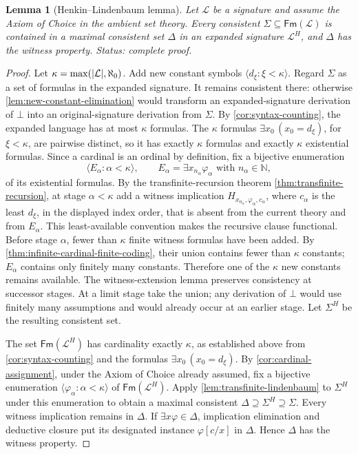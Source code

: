 \documentclass[11pt,oneside,openany]{book}
\theoremstyle{definition}
\theoremstyle{plain}
\newtheorem{lemma}[definition]{Lemma}
\theoremstyle{remark}
\DeclarePairedDelimiter{\abs}{\lvert}{\rvert}
\newcommand{\N}{\mathbb{N}}
\newcommand{\Lang}{\mathcal{L}}
\newcommand{\Fm}{\mathsf{Fm}}
\newcommand{\bottom}{\bot}
\begin{document}
\begin{lemma}[Henkin--Lindenbaum lemma]
\label{lem:henkin-lindenbaum}
Let \(\Lang\) be a signature and assume the Axiom of Choice in the
ambient set theory.  Every consistent
\(\Sigma\subseteq\Fm(\Lang)\) is contained in a maximal consistent set
\(\Delta\) in an expanded signature \(\Lang^H\), and \(\Delta\) has the
witness property.
\textit{Status: complete proof.}
\end{lemma}
\begin{proof}
 Let \(\kappa=\max(\abs{\Lang},\aleph_0)\).  Add new constant symbols
 \(\langle d_\xi:\xi<\kappa\rangle\).  Regard \(\Sigma\) as a set of formulas
 in the expanded signature.
It remains consistent there: otherwise
\cref{lem:new-constant-elimination} would transform an expanded-signature
derivation of \(\bottom\) into an original-signature derivation from
\(\Sigma\).  By \cref{cor:syntax-counting}, the expanded
language has at most \(\kappa\) formulas.  The \(\kappa\) formulas
\(\exists x_0\,(x_0=d_\xi)\), for \(\xi<\kappa\), are pairwise distinct, so
it has exactly \(\kappa\) formulas and exactly \(\kappa\) existential formulas.
Since a cardinal
is an ordinal by definition, fix a bijective enumeration
\[
  \langle E_\alpha:\alpha<\kappa\rangle,
  \qquad
  E_\alpha=\exists x_{n_\alpha}\varphi_\alpha
  \text{ with }n_\alpha\in\N,
\]
 of its existential formulas.  By the transfinite-recursion theorem
\cref{thm:transfinite-recursion}, at stage
\(\alpha<\kappa\) add a witness implication
\(H_{x_{n_\alpha},\varphi_\alpha,c_\alpha}\), where \(c_\alpha\) is the
least \(d_\xi\), in the displayed index order, that is absent from the current
theory and from \(E_\alpha\).  This least-available convention makes the
recursive clause functional.  Before stage \(\alpha\), fewer than
\(\kappa\) finite witness formulas have been added.  By
\cref{thm:infinite-cardinal-finite-coding}, their union contains fewer than
\(\kappa\) constants; \(E_\alpha\) contains only finitely many constants.
Therefore one of the \(\kappa\) new constants remains available.  The
witness-extension lemma
preserves consistency at successor stages.  At a limit stage take the union;
any derivation of \(\bottom\) would use finitely many assumptions and would
already occur at an earlier stage.  Let \(\Sigma^H\) be the resulting
consistent set.

The set \(\Fm(\Lang^H)\) has cardinality exactly \(\kappa\), as
established above from \cref{cor:syntax-counting} and the
formulas \(\exists x_0\,(x_0=d_\xi)\).  By
\cref{cor:cardinal-assignment}, under the Axiom of Choice already assumed,
fix a bijective enumeration
\(\langle\varphi_\alpha:\alpha<\kappa\rangle\) of \(\Fm(\Lang^H)\).
Apply \cref{lem:transfinite-lindenbaum} to \(\Sigma^H\) under this
enumeration to obtain a maximal consistent
\(\Delta\supseteq\Sigma^H\supseteq\Sigma\).  Every witness implication remains
in \(\Delta\).  If \(\exists x\varphi\in\Delta\), implication elimination
and deductive closure put its designated instance \(\varphi[c/x]\) in
\(\Delta\).  Hence \(\Delta\) has the witness property.
\end{proof}
\end{document}
